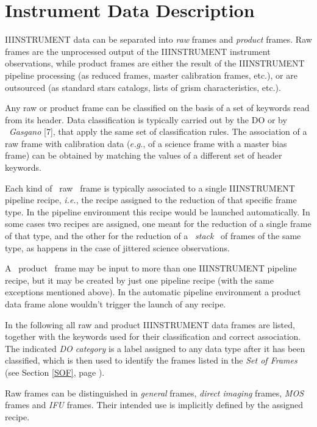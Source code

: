 \section{Instrument Data Description}
\label{DATA}

IIINSTRUMENT data can be separated into {\it raw} frames and {\it product} frames.
Raw frames are the unprocessed output of the IIINSTRUMENT instrument observations,
while product frames are either the result of the IIINSTRUMENT pipeline processing 
(as reduced frames, master calibration frames, etc.), or are outsourced (as 
standard stars catalogs, lists of grism characteristics, etc.).

Any raw or product frame can be classified on the basis of a set of keywords 
read from its header. Data classification is typically carried out by the 
DO or by \ {\it Gasgano} [7], that apply the same set of classification
rules. The 
association of a raw frame with calibration data ($e.g.$, of a science 
frame with a master bias frame) can be obtained by matching the values 
of a different set of header keywords.

Each kind of \ raw \ frame is typically associated to a single IIINSTRUMENT
pipeline recipe, {\it i.e.}, the recipe assigned to the reduction of that
specific frame type. In the pipeline environment this recipe would 
be launched automatically. In some cases two recipes are assigned,
one meant for the reduction of a single frame of that type, and the
other for the reduction of a \ {\it stack} \ of frames of the same 
type, as happens in the case of jittered science observations. 

A \ product \ frame may be input to more than one IIINSTRUMENT pipeline recipe, 
but it may be created by just one pipeline recipe (with the same
exceptions mentioned above). In the automatic pipeline environment a 
product data frame alone wouldn't trigger the launch of any recipe.

In the following all raw and product IIINSTRUMENT data frames are listed,
together with the keywords used for their classification and 
correct association. The indicated {\it DO category} is a 
label assigned to any data type after it has been classified,
which is then used to identify
the frames listed in the {\it Set of Frames} (see Section
\ref{SOF}, page \pageref{SOF}).

\label{DATA:RAW}

Raw frames can be distinguished in {\it general} frames, {\it direct imaging}
frames, {\it MOS} frames and {\it IFU} frames. Their intended use is
implicitly defined by the assigned recipe.

